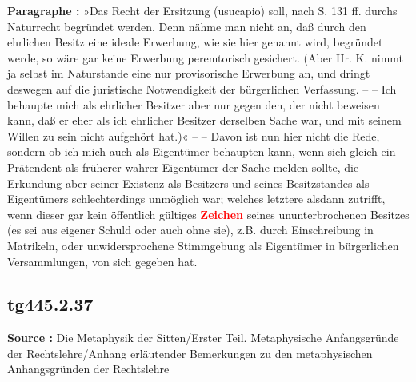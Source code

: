 \documentclass[a4paper,12pt,twoside]{book}
\newcommand{\match}[1]{\textcolor{red}{\textbf{#1}}}
\begin{document}
	\textbf{Paragraphe : }»Das Recht der Ersitzung (usucapio) soll, nach S. 131 ff. durchs Naturrecht begründet werden. Denn nähme man nicht an, daß durch den ehrlichen Besitz eine ideale Erwerbung, wie sie hier genannt wird, begründet werde, so wäre gar keine Erwerbung peremtorisch gesichert. (Aber Hr. K. nimmt ja selbst im Naturstande eine nur provisorische Erwerbung an, und dringt deswegen auf die juristische Notwendigkeit der bürgerlichen Verfassung. – – Ich behaupte mich als ehrlicher Besitzer aber nur gegen den, der nicht beweisen kann, daß er eher als ich ehrlicher Besitzer derselben Sache war, und mit seinem Willen zu sein nicht aufgehört hat.)« – – Davon ist nun hier nicht die Rede, sondern ob ich mich auch als Eigentümer behaupten kann, wenn sich gleich ein Prätendent als früherer wahrer Eigentümer der Sache melden sollte, die Erkundung aber seiner Existenz als Besitzers und seines Besitzstandes als Eigentümers schlechterdings unmöglich war; welches letztere alsdann zutrifft, wenn dieser gar kein öffentlich gültiges \match{Zeichen} seines ununterbrochenen Besitzes (es sei aus  eigener Schuld oder auch ohne sie), z.B. durch Einschreibung in Matrikeln, oder unwidersprochene Stimmgebung als Eigentümer in bürgerlichen Versammlungen, von sich gegeben hat. 
	
	\subsection*{tg445.2.37} 
	\textbf{Source : }Die Metaphysik der Sitten/Erster Teil. Metaphysische Anfangsgründe der Rechtslehre/Anhang erläutender Bemerkungen zu den metaphysischen Anhangsgründen der Rechtslehre\\  
	
\end{document}
